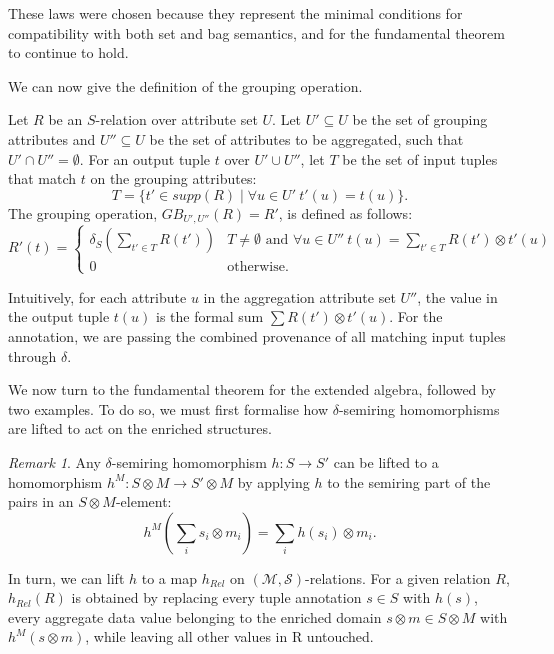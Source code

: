 \documentclass[oneside, 11pt]{amsbook}
\theoremstyle{plain}
\theoremstyle{definition}
\theoremstyle{remark}
\newtheorem*{remark}{Remark}
\begin{document}
These laws were chosen because they represent the minimal conditions for compatibility with both set and bag semantics, and for the fundamental theorem to continue to hold.

We can now give the definition of the grouping operation.

\begin{defn}[Grouping]
    Let $R$ be an $S$-relation over attribute set $U$. Let $U' \subseteq U$ be the set of grouping attributes and $U'' \subseteq U$ be the set of attributes to be aggregated, such that $U' \cap U'' = \emptyset$. For an output tuple $t$ over $U' \cup U''$, let $T$ be the set of input tuples that match $t$ on the grouping attributes:
    \[ T = \{ t' \in supp(R) \mid \forall u \in U' \ t'(u) = t(u) \}. \]
    The grouping operation, $GB_{U', U''}(R) = R'$, is defined as follows:
    \[
        R'(t) =
        \begin{cases}
            \delta_S \left( \sum_{t' \in T} R(t') \right) & T \neq \emptyset \text{ and } \forall u \in U'' \ t(u) = \sum_{t' \in T} R(t') \otimes t'(u) \\
            0                                             & \text{otherwise.}
        \end{cases}
    \]
\end{defn}

Intuitively, for each attribute $u$ in the aggregation attribute set $U''$, the value in the output tuple $t(u)$ is the formal sum $\sum R(t') \otimes t'(u)$. For the annotation, we are passing the combined provenance of all matching input tuples through $\delta$.

We now turn to the fundamental theorem for the extended algebra, followed by two examples. To do so, we must first formalise how $\delta$-semiring homomorphisms are lifted to act on the enriched structures.

\begin{remark}
    Any $\delta$-semiring homomorphism $h : S \to S'$ can be lifted to a homomorphism $h^M : S \otimes M \to S' \otimes M$ by applying $h$ to the semiring part of the pairs in an $S \otimes M$-element:
    \[
        h^M \left( \sum_{i} s_i \otimes m_i \right) = \sum_{i} h(s_i) \otimes m_i.
    \]

    In turn, we can lift $h$ to a map $h_{Rel}$ on $(\mathcal{M},\mathcal{S})$-relations. For a given relation $R$, $h_{Rel}(R)$ is obtained by replacing every tuple annotation $s \in S$ with $h(s)$, every aggregate data value belonging to the enriched domain $s \otimes m \in S \otimes M$ with $h^M(s \otimes m)$, while leaving all other values in R untouched.
\end{remark}
\end{document}
